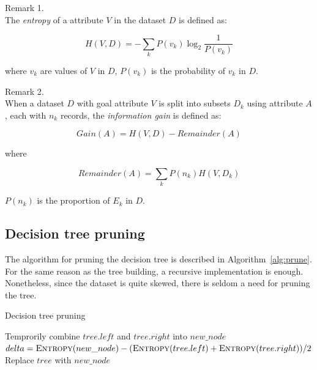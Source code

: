 \documentclass{article}
\begin{document}
\begin{description}
\item Remark 1. \hfill \\
The \textit{entropy} of a attribute $V$ in the dataset $D$ is defined as:

$$
H(V, D) = -\sum_k P(v_k) \log_2\frac{1}{P(v_k)}
$$

where $v_k$ are values of $V$ in $D$, $P(v_k)$ is the probability of $v_k$ in $D$.

\item Remark 2.\hfill \\
When a dataset $D$ with goal attribute $V$ is split into subsets $D_k$ using attribute $A$, each with $n_k$ records, the \textit{information gain} is defined as:

$$
Gain(A) = H(V, D) - Remainder(A)
$$

where

$$
Remainder(A) = \sum_k P(n_k) H(V, D_k)
$$

$P(n_k)$ is the proportion of $E_k$ in $D$.
\end{description}

\subsection{Decision tree pruning}

The algorithm for pruning the decision tree is described in Algorithm~\ref{alg:prune}. For the same reason as the tree building, a recursive implementation is enough. Nonetheless, since the dataset is quite skewed, there is seldom a need for pruning the tree.

\begin{algorithm}[H]
\centering
\caption{Decision tree pruning}
\label{alg:prune}
  \begin{algorithmic}[1]
    		\State{}
    	\EndIf
    		\State{}
    	\EndIf
    		\State Temprorily combine $tree.left$ and $tree.right$ into $new\_node$
    		\State $delta = \Call{Entropy}{new\_node}-  (\Call{Entropy}{tree.left} + \Call{Entropy}{tree.right}) / 2$
    			\State Replace $tree$ with $new\_node$
    		\EndIf
    	\EndIf
    \EndFunction
  \end{algorithmic}
\end{algorithm}
\end{document}
